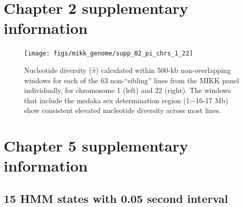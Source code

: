 \documentclass[
]{book}
\begin{document}
\hypertarget{appendix-appendix}{%
\appendix}


\hypertarget{chapter-2-supplementary-information}{%
\chapter{Chapter 2 supplementary information}\label{chapter-2-supplementary-information}}



\begin{figure}
\texttt{[image: figs/mikk\_genome/supp\_02\_pi\_chrs\_1\_22]} \caption{Nucleotide diversity (\(\hat{\pi}\)) calculated within 500-kb non-overlapping windows for each of the 63 non-``sibling'' lines from the MIKK panel individually, for chromosome 1 (left) and 22 (right). The windows that include the medaka sex determination region (1:\textasciitilde16-17 Mb) show consistent elevated nucleotide diversity across most lines.}\label{fig:nuc-div-per-indiv}
\end{figure}

\hypertarget{chapter-5-supplementary-information}{%
\chapter{Chapter 5 supplementary information}\label{chapter-5-supplementary-information}}

\hypertarget{hmm-states-with-0.05-second-interval}{%
\section{15 HMM states with 0.05 second interval}\label{hmm-states-with-0.05-second-interval}}
\end{document}
